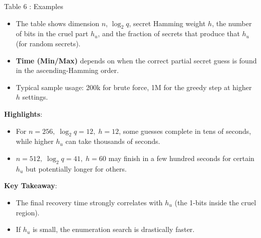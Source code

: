 \documentclass{beamer}
\begin{document}
\begin{frame}{Table 6 \cite{concrete_results}: Examples}
  \footnotesize
  \begin{itemize}
    \item The table shows dimension $n$, $\log_2 q$, secret Hamming weight $h$, the number of bits in the cruel part $h_u$, and the fraction of secrets that produce that $h_u$ (for random secrets).
    \item \textbf{Time (Min/Max)} depends on when the correct partial secret guess is found in the ascending-Hamming order.
    \item Typical sample usage: 200k for brute force, 1M for the greedy step at higher $h$ settings.
  \end{itemize}

  \vspace{0.2cm}
  \textbf{Highlights}:
  \begin{itemize}
    \item For $n=256,\;\log_2 q=12,\;h=12$, some guesses complete in tens of seconds, while higher $h_u$ can take thousands of seconds.
    \item $n=512,\;\log_2 q=41,\;h=60$ may finish in a few hundred seconds for certain $h_u$ but potentially longer for others.
  \end{itemize}
  \vspace{0.3cm}

  \textbf{Key Takeaway}: 
  \begin{itemize}
    \item The final recovery time strongly correlates with $h_u$ (the 1-bits inside the cruel region). 
    \item If $h_u$ is small, the enumeration search is drastically faster.
  \end{itemize}
\end{frame}

\end{document}
